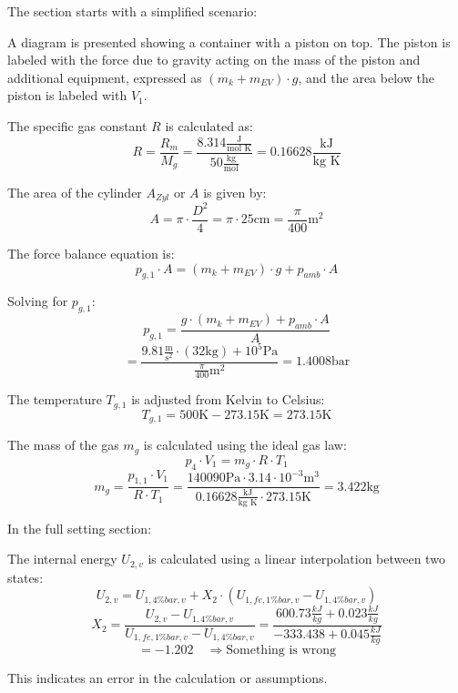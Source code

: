 The section starts with a simplified scenario:

A diagram is presented showing a container with a piston on top. The piston is labeled with the force due to gravity acting on the mass of the piston and additional equipment, expressed as \((m_k + m_{EV}) \cdot g\), and the area below the piston is labeled with \(V_1\).

The specific gas constant \(R\) is calculated as:
\[ R = \frac{R_m}{M_g} = \frac{8.314 \frac{\text{J}}{\text{mol K}}}{50 \frac{\text{kg}}{\text{mol}}} = 0.16628 \frac{\text{kJ}}{\text{kg K}} \]

The area of the cylinder \(A_{Zyl}\) or \(A\) is given by:
\[ A = \pi \cdot \frac{D^2}{4} = \pi \cdot 25 \text{cm} = \frac{\pi}{400} \text{m}^2 \]

The force balance equation is:
\[ p_{g,1} \cdot A = (m_k + m_{EV}) \cdot g + p_{amb} \cdot A \]

Solving for \(p_{g,1}\):
\[ p_{g,1} = \frac{g \cdot (m_k + m_{EV}) + p_{amb} \cdot A}{A} \]
\[ = \frac{9.81 \frac{\text{m}}{\text{s}^2} \cdot (32 \text{kg}) + 10^5 \text{Pa}}{\frac{\pi}{400} \text{m}^2} = 1.4008 \text{bar} \]

The temperature \(T_{g,1}\) is adjusted from Kelvin to Celsius:
\[ T_{g,1} = 500 \text{K} - 273.15 \text{K} = 273.15 \text{K} \]

The mass of the gas \(m_g\) is calculated using the ideal gas law:
\[ p_{4} \cdot V_1 = m_g \cdot R \cdot T_1 \]
\[ m_g = \frac{p_{1,1} \cdot V_1}{R \cdot T_1} = \frac{140090 \text{Pa} \cdot 3.14 \cdot 10^{-3} \text{m}^3}{0.16628 \frac{\text{kJ}}{\text{kg K}} \cdot 273.15 \text{K}} = 3.422 \text{kg} \]

In the full setting section:

The internal energy \(U_{2,v}\) is calculated using a linear interpolation between two states:
\[ U_{2,v} = U_{1,4\%bar,v} + X_2 \cdot \left( U_{1,fe,1\%bar,v} - U_{1,4\%bar,v} \right) \]
\[ X_2 = \frac{U_{2,v} - U_{1,4\%bar,v}}{U_{1,fe,1\%bar,v} - U_{1,4\%bar,v}} = \frac{600.73 \frac{kJ}{kg} + 0.023 \frac{kJ}{kg}}{-333.438 + 0.045 \frac{kJ}{kg}} \]
\[ = -1.202 \quad \Rightarrow \text{Something is wrong} \]

This indicates an error in the calculation or assumptions.